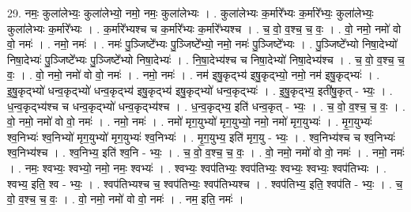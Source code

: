 \documentclass[17pt]{extarticle}
\begin{document}
29. नमः॒ कुला॑लेभ्यः॒ कुला॑लेभ्यो॒ नमो॒ नमः॒ कुला॑लेभ्यः । . कुला॑लेभ्यः क॒र्मारे᳚भ्यः क॒र्मारे᳚भ्यः॒ कुला॑लेभ्यः॒ कुला॑लेभ्यः क॒र्मारे᳚भ्यः । . क॒र्मारे᳚भ्यश्च च क॒र्मारे᳚भ्यः क॒र्मारे᳚भ्यश्च । . च॒ वो॒ व॒श्च॒ च॒ वः॒ । . वो॒ नमो॒ नमो॑ वो वो॒ नमः॑ । . नमो॒ नमः॑ । . नमः॑ पु॒ञ्जिष्टे᳚भ्यः पु॒ञ्जिष्टे᳚भ्यो॒ नमो॒ नमः॑ पु॒ञ्जिष्टे᳚भ्यः । . पु॒ञ्जिष्टे᳚भ्यो निषा॒देभ्यो॑ निषा॒देभ्यः॑ पु॒ञ्जिष्टे᳚भ्यः पु॒ञ्जिष्टे᳚भ्यो निषा॒देभ्यः॑ । . नि॒षा॒देभ्य॑श्च च निषा॒देभ्यो॑ निषा॒देभ्य॑श्च । . च॒ वो॒ व॒श्च॒ च॒ वः॒ । . वो॒ नमो॒ नमो॑ वो वो॒ नमः॑ । . नमो॒ नमः॑ । . नम॑ इषु॒कृद्भ्य॑ इषु॒कृद्भ्यो॒ नमो॒ नम॑ इषु॒कृद्भ्यः॑ । . इ॒षु॒कृद्भ्यो॑ धन्व॒कृद्भ्यो॑ धन्व॒कृद्भ्य॑ इषु॒कृद्भ्य॑ इषु॒कृद्भ्यो॑ धन्व॒कृद्भ्यः॑ । . इ॒षु॒कृद्भ्य॒ इती॑षु॒कृत् - भ्यः॒ । . ध॒न्व॒कृद्भ्य॑श्च च धन्व॒कृद्भ्यो॑ धन्व॒कृद्भ्य॑श्च । . ध॒न्व॒कृद्भ्य॒ इति॑ धन्व॒कृत् - भ्यः॒ । . च॒ वो॒ व॒श्च॒ च॒ वः॒ । . वो॒ नमो॒ नमो॑ वो वो॒ नमः॑ । . नमो॒ नमः॑ । . नमो॑ मृग॒युभ्यो॑ मृग॒युभ्यो॒ नमो॒ नमो॑ मृग॒युभ्यः॑ । . मृ॒ग॒युभ्यः॑ श्व॒निभ्यः॑ श्व॒निभ्यो॑ मृग॒युभ्यो॑ मृग॒युभ्यः॑ श्व॒निभ्यः॑ । . मृ॒ग॒युभ्य॒ इति॑ मृग॒यु - भ्यः॒ । . श्व॒निभ्य॑श्च च श्व॒निभ्यः॑ श्व॒निभ्य॑श्च । . श्व॒निभ्य॒ इति॑ श्व॒नि - भ्यः॒ । . च॒ वो॒ व॒श्च॒ च॒ वः॒ । . वो॒ नमो॒ नमो॑ वो वो॒ नमः॑ । . नमो॒ नमः॑ । . नमः॒ श्वभ्यः॒ श्वभ्यो॒ नमो॒ नमः॒ श्वभ्यः॑ । . श्वभ्यः॒ श्वप॑तिभ्यः॒ श्वप॑तिभ्यः॒ श्वभ्यः॒ श्वभ्यः॒ श्वप॑तिभ्यः । . श्वभ्य॒ इति॒ श्व - भ्यः॒ । . श्वप॑तिभ्यश्च च॒ श्वप॑तिभ्यः॒ श्वप॑तिभ्यश्च । . श्वप॑तिभ्य॒ इति॒ श्वप॑ति - भ्यः॒ । . च॒ वो॒ व॒श्च॒ च॒ वः॒ । . वो॒ नमो॒ नमो॑ वो वो॒ नमः॑ । . नम॒ इति॒ नमः॑ । \newline
\end{document}
